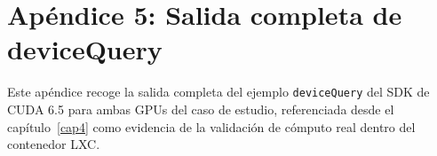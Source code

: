 ﻿\setcounter{chapter}{10}
\setcounter{section}{0}
\setcounter{table}{0}
\setcounter{figure}{0}


\makeatletter
\def\@currentlabel{\thechapter}
\makeatother
\label{ape:devicequery}

\chapter*{Apéndice 5: Salida completa de deviceQuery}

Este apéndice recoge la salida completa del ejemplo \texttt{deviceQuery} del SDK de CUDA 6.5 para ambas GPUs del caso de estudio, referenciada desde el capítulo~\ref{cap4} como evidencia de la validación de cómputo real dentro del contenedor LXC.

